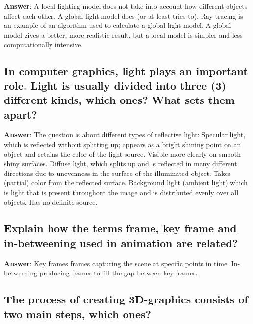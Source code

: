 \documentclass[a4paper,11pt,oneside]{article}
\begin{document}
\begin{sloppypar}
\label{q:305:sa:en:True}

\textbf{Answer}: A local lighting model does not take into account how different objects affect each other. A global light model does (or at least tries to). Ray tracing is an example of an algorithm used to calculate a global light model. A global model gives a better, more realistic result, but a local model is simpler and less computationally intensive.



\subsection{In computer graphics, light plays an important role. Light is usually divided into three (3) different kinds, which ones? What sets them apart?}

\label{q:306:sa:en:True}

\textbf{Answer}: The question is about different types of reflective light: Specular light, which is reflected without splitting up; appears as a bright shining point on an object and retains the color of the light source. Visible more clearly on smooth shiny surfaces. Diffuse light, which splits up and is reflected in many different directions due to unevenness in the surface of the illuminated object. Takes (partial) color from the reflected surface. Background light (ambient light) which is light that is present throughout the image and is distributed evenly over all objects. Has no definite source.



\subsection{Explain how the terms frame, key frame and in-betweening used in animation are related?}

\label{q:307:sa:en:True}

\textbf{Answer}: Key frames {\textendash} frames capturing the scene at specific points in time. In-betweening {\textendash} producing frames to fill the gap between key frames.



\subsection{The process of creating 3D-graphics consists of two main steps, which ones?}

\label{q:308:sa:en:True}


\end{sloppypar}
\end{document}
